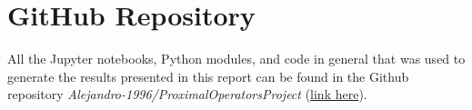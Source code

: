 \section{GitHub Repository}
All the Jupyter notebooks, Python modules, and code in general that was used to generate the results presented in this report can be found in the Github repository \textit{Alejandro-1996/ProximalOperatorsProject} (\href{https://github.com/Alejandro-1996/ProximalOperatorsProject}{link here}).
